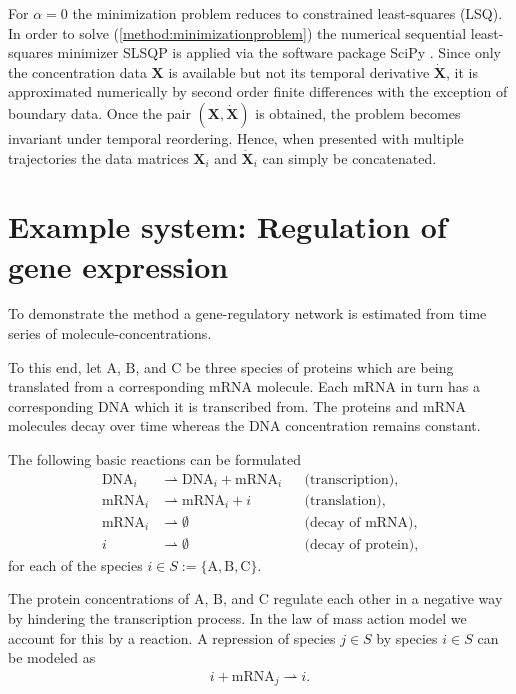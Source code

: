 \documentclass[oneside, abstracton, titlepage]{scrartcl}
\begin{document}
	For $\alpha=0$ the minimization problem reduces to constrained least-squares (LSQ). In order to solve (\ref{method:minimizationproblem}) the numerical sequential least-squares minimizer SLSQP \cite{Kraft1988} is applied via the software package SciPy \cite{SciPy}. Since only the concentration data $\mathbf{X}$ is available but not its temporal derivative $\dot{\mathbf{X}}$, it is approximated numerically by second order finite differences with the exception of boundary data. Once the pair $(\mathbf{X}, \dot{\mathbf{X}})$ is obtained, the problem becomes invariant under temporal reordering. Hence, when presented with multiple trajectories the data matrices $\mathbf{X}_i$ and $\dot{\mathbf{X}}_i$ can simply be concatenated.
	
    \section{Example system: Regulation of gene expression}\label{sec:generegulation}

    To demonstrate the method a gene-regulatory network is estimated from time series of molecule-concentrations.
    
    To this end, let $\mathrm{A}$, $\mathrm{B}$, and $\mathrm{C}$ be three species of proteins which are being translated from a corresponding $\mathrm{mRNA}$ molecule. Each $\mathrm{mRNA}$ in turn has a corresponding $\mathrm{DNA}$ which it is transcribed from. The proteins and $\mathrm{mRNA}$ molecules decay over time whereas the $\mathrm{DNA}$ concentration remains constant.
    
    The following basic reactions can be formulated
	\begin{align*}
		\mathrm{DNA}_i &\rightharpoonup \mathrm{DNA}_i + \mathrm{mRNA}_i &&\text{(transcription)},\\
		\mathrm{mRNA}_i &\rightharpoonup \mathrm{mRNA}_i + i &&\text{(translation)},\\
		\mathrm{mRNA}_i &\rightharpoonup \emptyset &&\text{(decay of mRNA)},\\
		i &\rightharpoonup \emptyset &&\text{(decay of protein)},
    \end{align*}
    for each of the species $i\in S:=\{\mathrm{A},\mathrm{B},\mathrm{C}\}$.

    The protein concentrations of $\mathrm{A}$, $\mathrm{B}$, and $\mathrm{C}$ regulate each other in a negative way by hindering the transcription process. In the law of mass action model we account for this by a reaction. A repression of species $j\in S$ by species $i\in S$ can be modeled as
    \begin{align*}
    i + \mathrm{mRNA}_j \rightharpoonup i.
    \end{align*}
\end{document}
